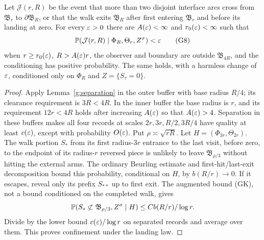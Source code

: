 \begin{lemma}\label{g:extra}
Let \(\mathcal J(r,R)\) be the event that more than two disjoint
interface arcs cross from \(\mathfrak B_r\) to
\(\partial\mathfrak B_R\), or that the walk exits
\(\mathfrak B_R\) after first entering \(\mathfrak B_r\) and before
its landing at zero. For every \(\varepsilon>0\) there are
\(A(\varepsilon)<\infty\) and \(r_0(\varepsilon)<\infty\)
such that
\[
 \mathbb P(\mathcal J(r,R)\mid\Phi_R,\Theta_r,Z^\sigma)<\varepsilon
 \tag{G8}
\]
when \(r\geq r_0(\varepsilon)\), \(R>A(\varepsilon)r\), the observer and boundary are outside
\(\mathfrak B_{4R}\), and the conditioning has positive probability.
The same holds, with a harmless change of \(\varepsilon\), conditioned
only on \(\Phi_R\) and \(Z=\{S_\tau=0\}\).
\end{lemma}

\begin{proof}
Apply Lemma~\ref{g:separation} in the outer buffer with base radius
\(R/4\); its clearance requirement is \(3R<4R\).  In the inner buffer
the base radius is \(r\), and its requirement \(12r<4R\) holds after
increasing \(A(\varepsilon)\) so that \(A(\varepsilon)>4\).  Separation in these
buffers makes all four records at scales \(2r,3r,R/2,3R/4\) have quality
at least \(c(\varepsilon)\), except with probability \(O(\varepsilon)\). Put \(\rho\asymp\sqrt{rR}\).
Let \(H=(\Phi_{3r},\Theta_{2r})\). The walk portion \(S_*\) from its
first radius-\(3r\) entrance to the last visit, before zero, to the
endpoint of its radius-\(r\) reversed piece is unlikely to leave
\(\mathfrak B_{\rho/3}\) without hitting the external arms. The
ordinary Beurling estimate and first-hit/last-exit decomposition
bound this probability, conditional on \(H\), by
\(b(R/r)\to0\). If it escapes, reveal only its prefix \(S_{**}\)
up to first exit. The augmented bound (GK), not a bound conditioned
on the completed walk, gives
\[
 \mathbb P(S_*\not\subset\mathfrak B_{\rho/3},Z^\sigma\mid H)
       \leq C b(R/r)/\log r.
\]
Divide by the lower bound \(c(\varepsilon)/\log r\) on separated records
and average over them. This proves confinement under the landing law.


\end{proof}
